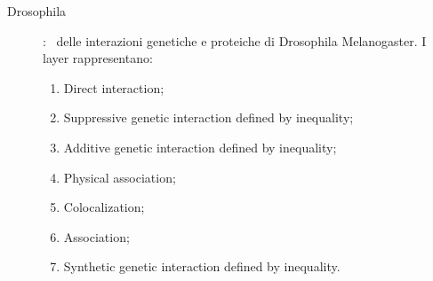 \begin{description}
    \item[Drosophila]: \mulx\ delle interazioni genetiche e proteiche di 
    Drosophila Melanogaster. I layer rappresentano:
    \begin{enumerate}
        \item Direct interaction;
        \item Suppressive genetic interaction defined by inequality;
        \item Additive genetic interaction defined by inequality;
        \item Physical association;
        \item Colocalization;
        \item Association;
        \item Synthetic genetic interaction defined by inequality.
    \end{enumerate} 
    

\end{description}
